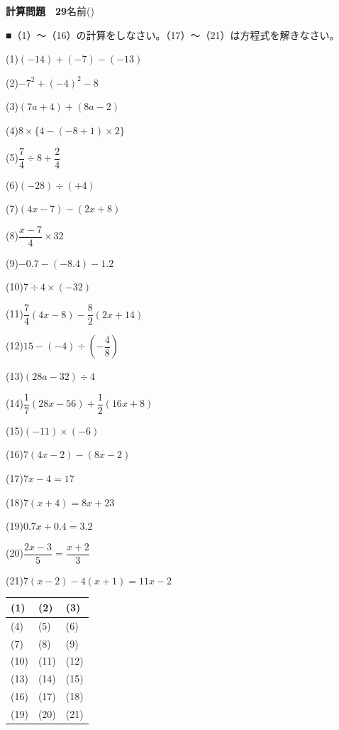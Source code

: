 \documentclass[a4paper,11pt]{ltjsarticle}
\newlength{\qcol}\setlength{\qcol}{0.47\textwidth}
\newlength{\qgap}
\newlength{\anscolw}\setlength{\anscolw}{0.30\textwidth}
\newlength{\ansh}
\newcommand{\Q}[2]{\parbox[t]{\qcol}{\raggedright (#1)\hspace{0.6em}$\displaystyle #2$}}
\newcommand{\QR}[4]{\Q{#1}{#2}\hfill\Q{#3}{#4}\par\vspace{\qgap}}
\newcommand{\anscell}[1]{\rule[-\ansdrop]{0pt}{\ansh}(#1)}
\newlength{\ansdrop}
\begin{document}
{\large\bfseries 計算問題　29}\hfill 名前(\underline{\hspace{32mm}})\par\vspace{3mm}
■（1）〜（16）の計算をしなさい。（17）〜（21）は方程式を解きなさい。\par\vspace{3mm}
\setlength{\qgap}{5.4mm}
\QR{1}{(-14)+(-7)-(-13)}{2}{-7^2+(-4)^2-8}
\QR{3}{(7a+4)+(8a-2)}{4}{8\times\{4-(-8+1)\times2\}}
\QR{5}{\dfrac{7}{4}\div8+\dfrac{2}{4}}{6}{(-28)\div(+4)}
\QR{7}{(4x-7)-(2x+8)}{8}{\dfrac{x-7}{4}\times32}
\QR{9}{-0.7-(-8.4)-1.2}{10}{7\div4\times(-32)}
\QR{11}{\dfrac{7}{4}(4x-8)-\dfrac{8}{2}(2x+14)}{12}{15-(-4)\div\left(-\dfrac{4}{8}\right)}
\QR{13}{(28a-32)\div4}{14}{\dfrac{1}{7}(28x-56)+\dfrac{1}{2}(16x+8)}
\QR{15}{(-11)\times(-6)}{16}{7(4x-2)-(8x-2)}
\QR{17}{7x-4=17}{18}{7(x+4)=8x+23}
\QR{19}{0.7x+0.4=3.2}{20}{\dfrac{2x-3}{5}=\dfrac{x+2}{3}}
\vspace{1mm}
\Q{21}{7(x-2)-4(x+1)=11x-2}\par\vspace{3mm}
\setlength{\ansh}{9.5mm}\setlength{\ansdrop}{6mm}%
\begin{center}\begin{tabular}{|p{\anscolw}|p{\anscolw}|p{\anscolw}|}\hline
\anscell{1} & \anscell{2} & \anscell{3} \\\hline
\anscell{4} & \anscell{5} & \anscell{6} \\\hline
\anscell{7} & \anscell{8} & \anscell{9} \\\hline
\anscell{10} & \anscell{11} & \anscell{12} \\\hline
\anscell{13} & \anscell{14} & \anscell{15} \\\hline
\anscell{16} & \anscell{17} & \anscell{18} \\\hline
\anscell{19} & \anscell{20} & \anscell{21} \\\hline
\end{tabular}\end{center}
\end{document}
